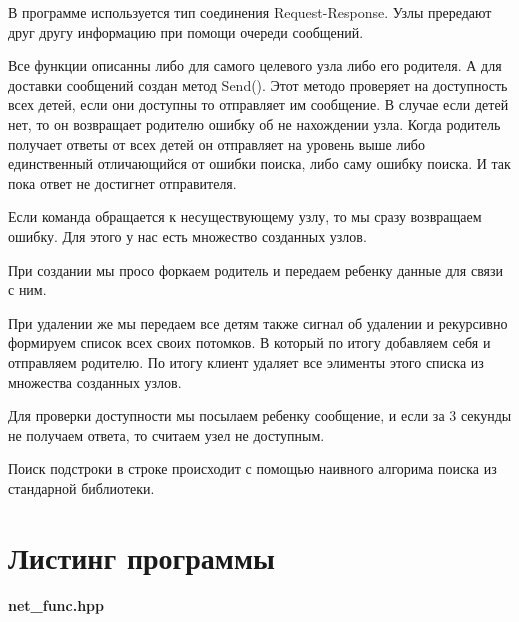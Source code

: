 \documentclass[pdf, unicode, 12pt, a4paper,oneside,fleqn]{article}
\begin{document}
В программе используется тип соединения Request-Response. Узлы прередают
друг другу информацию при помощи очереди сообщений.

Все функции описанны либо для самого целевого узла либо его родителя. А для 
доставки сообщений создан метод Send(). Этот методо проверяет на доступность всех детей,
если они доступны то отправляет им сообщение. В случае если детей нет, то он возвращает родителю
ошибку об не нахождении узла. Когда родитель получает ответы от всех детей он 
отправляет на уровень выше либо единственный отличающийся от ошибки поиска, либо саму ошибку поиска.
И так пока ответ не достигнет отправителя.

Если команда обращается к несуществующему узлу, то мы сразу возвращаем ошибку. Для этого у
нас есть множество созданных узлов.

При создании мы просо форкаем родитель и передаем ребенку данные для связи с ним.

При удалении же мы передаем все детям также сигнал об удалении и рекурсивно 
формируем список всех своих потомков. В который по итогу добавляем себя и отправляем родителю.
По итогу клиент удаляет все элименты этого списка из множества созданных узлов.

Для проверки доступности мы посылаем ребенку сообщение, и если за 3 секунды не получаем ответа, то считаем узел не доступным.

Поиск подстроки в строке происходит с помощью наивного алгорима поиска из стандарной библиотеки.

\section{Листинг программы}

{\large\textbf{net\_func.hpp}}
\end{document}
